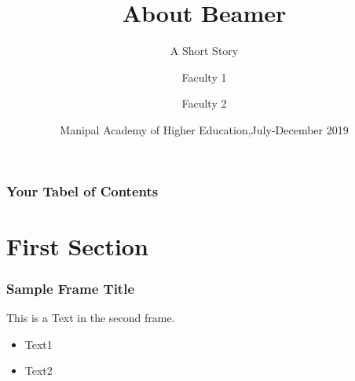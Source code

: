 \documentclass{beamer}
\title{About Beamer}
\subtitle{A Short Story}
\author[Author 1, Author 2]{Faculty 1\inst{1} \and Faculty 2\inst{2}}
\institute{MIT,MAHE,Manipal}
{
	\inst{1}
	MIT,MAHE,Manipal
	\and \inst{2}
	\Deparment of Computer Science \& Engineering
	MIT,MAHE,Manipal.
}
\date[Dept of CSE,MIT 2019]
{Manipal Academy of Higher Education,July-December 2019}
\begin{document}
	\begin{frame}
		\frametitle{Your Tabel of Contents}
		\tableofcontents
	\end{frame}

	\section{First Section}
	\begin{frame}
		\frametitle{Sample Frame Title}
		This is a Text in the second frame.
		\begin{itemize}
			\item <1-> Text1
			\item <2-> Text2
		\end{itemize}
	\end{frame}
\end{document}
